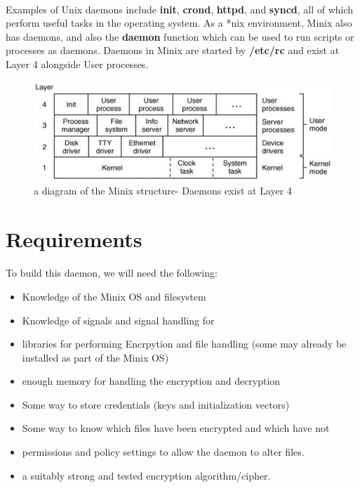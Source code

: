 \documentclass{article}
\begin{document}
        \paragraph{}Examples of Unix daemons include \textbf{init}, \textbf{crond}, \textbf{httpd}, and \textbf{syncd}, all of which perform useful tasks in the operating system. As a *nix environment, Minix also has daemons, and also the \textbf{daemon} function which can be used to run scripts or processes as daemons. Daemons in Minix are started by \textbf{/etc/rc} and exist at Layer 4 alongside User processes\parencite{OS_DESIGN}.
        \begin{figure}[htbp]
            \centering\includegraphics[width=\textwidth]{minix_structure.jpg}
            \caption{a diagram of the Minix structure- Daemons exist at Layer 4\parencite{OS_DESIGN}}
            \label{fig:my_label}
        \end{figure}


\section{Requirements}
    \paragraph{}To build this daemon, we will need the following:
    \begin{itemize}
        \item Knowledge of the Minix OS and filesystem
        \item Knowledge of signals and signal handling for
        \item libraries for performing Encrpytion and file handling (some may already be installed as part of the Minix OS)
        \item enough memory for handling the encryption and decryption
        \item Some way to store credentials (keys and initialization vectors)
        \item Some way to know which files have been encrypted and which have not
        \item permissions and policy settings to allow the daemon to alter files.
        \item a suitably strong and tested encryption algorithm/cipher.
    \end{itemize}
\end{document}
